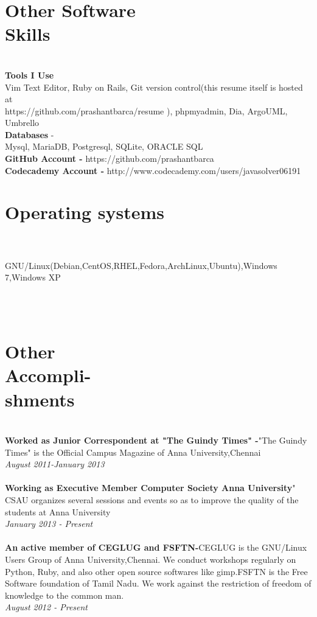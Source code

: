 \documentclass[margin,line]{resume}
\begin{document}
\begin{resume}
    \section{\mysidestyle Other Software\\Skills} \\
    \textbf{Tools I Use}  \\Vim Text Editor, Ruby on Rails, Git version control(this resume itself is hosted at \\https://github.com/prashantbarca/resume ), phpmyadmin, Dia, ArgoUML, Umbrello
    \\\textbf{Databases} - \\Mysql, MariaDB, Postgresql, SQLite, ORACLE SQL
    \\\textbf{GitHub Account -}  https://github.com/prashantbarca
    \\\textbf{Codecademy Account -}  http://www.codecademy.com/users/javasolver06191
    \\\section{\mysidestyle Operating systems}\\ 
    \\ GNU/Linux(Debian,CentOS,RHEL,Fedora,ArchLinux,Ubuntu),Windows 7,Windows XP 


	 \\\\\section{\mysidestyle Other\\Accompli-\\shments}\\ 
    \textbf{Worked as Junior Correspondent at "The Guindy Times" -}"The Guindy Times" is the Official Campus Magazine of Anna University,Chennai
    \\\textsl{August 2011-January 2013}
    \\\\\textbf{Working as Executive Member Computer Society Anna University}" CSAU organizes several sessions and events so as to improve the quality of the students at Anna University
    \\\textsl{January 2013 - Present}
\\\\\textbf{An active member of CEGLUG and FSFTN-}CEGLUG is the GNU/Linux Users Group of Anna University,Chennai. We conduct workshops regularly on Python, Ruby, and also other open source softwares like gimp.FSFTN is the Free Software foundation of Tamil Nadu. We work against the restriction of freedom of knowledge to the common man. 
\\\textsl{August 2012 - Present}


\end{resume}
\end{document}
